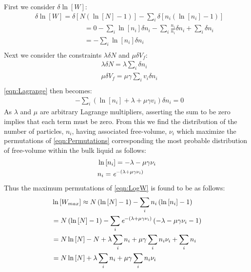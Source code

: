 First we consider $\delta\ln\left[W\right]$:
\begin{equation}
	\begin{split}
		&\delta\ln\left[W \right ]=\delta\left[ N\left(\ln\left[N\right]-1\right)\right]-\sum_{i}\delta\left[ n_i\left(\ln\left[n_i\right]-1\right)\right]\\
		&\;\;\;\;\;\;\;\;\;\;\;\;\;\;\;\;\;\;\;\;\;\;\;\;\;\;=0-\sum_{i}\ln\left[n_i \right ]\delta n_i-\sum_{i}\frac{n_i}{n_i}\delta n_i+\sum_{i}\delta n_i\\
		&\;\;\;\;\;\;\;\;\;\;\;\;\;\;\;\;\;\;\;\;\;\;\;\;\;\;=-\sum_{i}\ln\left[n_i \right ]\delta n_i\\
	\end{split}
	\label{eqn:deltaW}
\end{equation}
Next we consider the constraints $\lambda\delta N$ and $\mu\delta V_f$:
\begin{equation}
	\begin{split}
		&\lambda\delta N=\lambda\sum_{i}\delta n_i\\
		&\mu\delta V_f=\mu\gamma\sum_{i} v_i \delta n_i\\
	\end{split}
	\label{eqn:constraints}
\end{equation}
\eqn\nolinebreak \ref{eqn:Lagrange} then becomes:
\begin{equation}
	\begin{split}
		&-\sum_{i}\left(\ln\left[n_i \right ]+\lambda + \mu\gamma v_i\right)\delta n_i=0
	\end{split}
	\label{eqn:finalLegrange}
\end{equation}
As $\lambda$ and $\mu$ are arbitrary Lagrange multipliers, asserting the sum to be zero implies that each term must be zero.  From this we find the distribution of the number of particles, $n_i$, having associated free-volume, $\nu_i$ which maximize the permutations of \eqn\nolinebreak \ref{eqn:Permutations} corresponding the most probable distribution of free-volume within the bulk liquid as follows:
\begin{equation}
	\begin{split}
		&\ln\left[n_i\right]=-\lambda -\mu\gamma\nu_i\\
		&n_i=\textit{e}^{-\left(\lambda+\mu\gamma\nu_i\right)}
	\end{split}
	\label{eqn:discreteDist}
\end{equation}
Thus the maximum permutations of \eqn\nolinebreak \ref{eqn:LogW} is found to be as follows:
\begin{equation}
	\begin{split}
		&\ln\left[W_{max}\right]\approx N\left(\ln\left[N\right]-1\right)-\sum_{i}n_i\left(\ln\left[n_i\right]-1\right)\\
		&=N\left(\ln\left[N\right]-1\right)-\sum_{i} \textit{e}^{-\left(\lambda+\mu\gamma\nu_i\right)}\left(-\lambda-\mu\gamma\nu_i-1\right)\\
		&=N\ln\left[N\right]-N +\lambda\sum_{i}n_i+\mu\gamma\sum_{i}n_i\nu_i+\sum_{i}n_i\\
		&=N\ln\left[N\right] +\lambda\sum_{i}n_i+\mu\gamma\sum_{i}n_i\nu_i\\
	\end{split}
\end{equation}
